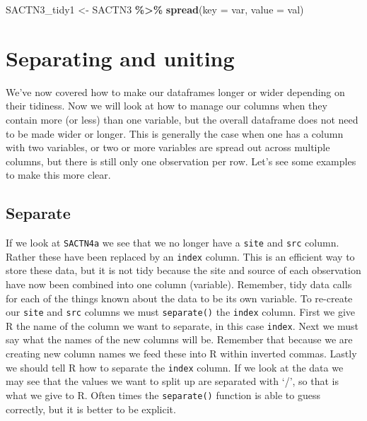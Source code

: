 \documentclass[
]{book}
\newenvironment{Shaded}{\begin{snugshade}}{\end{snugshade}}
\newcommand{\DataTypeTok}[1]{\textcolor[rgb]{0.13,0.29,0.53}{#1}}
\newcommand{\KeywordTok}[1]{\textcolor[rgb]{0.13,0.29,0.53}{\textbf{#1}}}
\newcommand{\NormalTok}[1]{#1}
\newcommand{\OperatorTok}[1]{\textcolor[rgb]{0.81,0.36,0.00}{\textbf{#1}}}
\newcommand{\StringTok}[1]{\textcolor[rgb]{0.31,0.60,0.02}{#1}}
\begin{document}
\begin{Shaded}
\begin{Highlighting}[]
\NormalTok{SACTN3\_tidy1 <{-}}\StringTok{ }\NormalTok{SACTN3 }\OperatorTok{\%>\%}\StringTok{ }
\StringTok{  }\KeywordTok{spread}\NormalTok{(}\DataTypeTok{key =}\NormalTok{ var, }\DataTypeTok{value =}\NormalTok{ val)}
\end{Highlighting}
\end{Shaded}

\hypertarget{separating-and-uniting}{%
\section{Separating and uniting}\label{separating-and-uniting}}

We've now covered how to make our dataframes longer or wider depending on their tidiness. Now we will look at how to manage our columns when they contain more (or less) than one variable, but the overall dataframe does not need to be made wider or longer. This is generally the case when one has a column with two variables, or two or more variables are spread out across multiple columns, but there is still only one observation per row. Let's see some examples to make this more clear.

\hypertarget{separate}{%
\subsection{Separate}\label{separate}}

If we look at \texttt{SACTN4a} we see that we no longer have a \texttt{site} and \texttt{src} column. Rather these have been replaced by an \texttt{index} column. This is an efficient way to store these data, but it is not tidy because the site and source of each observation have now been combined into one column (variable). Remember, tidy data calls for each of the things known about the data to be its own variable. To re-create our \texttt{site} and \texttt{src} columns we must \texttt{separate()} the \texttt{index} column. First we give R the name of the column we want to separate, in this case \texttt{index}. Next we must say what the names of the new columns will be. Remember that because we are creating new column names we feed these into R within inverted commas. Lastly we should tell R how to separate the \texttt{index} column. If we look at the data we may see that the values we want to split up are separated with `/', so that is what we give to R. Often times the \texttt{separate()} function is able to guess correctly, but it is better to be explicit.
\end{document}
